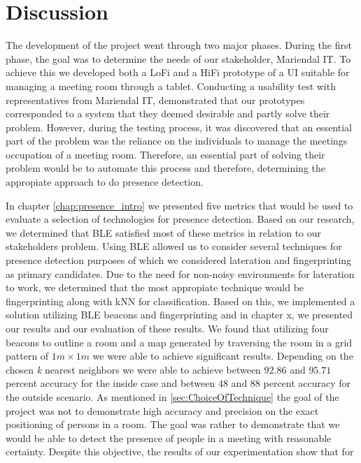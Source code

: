 \chapter{Discussion}\label{chap:discussion}
The development of the project went through two major phases. 
During the first phase, the goal was to determine the needs of our stakeholder, Mariendal IT. 
To achieve this we developed both a LoFi and a HiFi prototype of a UI suitable for managing a meeting room through a tablet.
Conducting a usability test with representatives from Mariendal IT, demonstrated that our prototypes corresponded to a system that they deemed desirable and partly solve their problem.
However, during the testing process, it was discovered that an essential part of the problem was the reliance on the individuals to manage the meetings occupation of a meeting room.
Therefore, an essential part of solving their problem would be to automate this process and therefore, determining the appropiate approach to do presence detection.

In chapter \ref{chap:presence_intro} we presented five metrics that would be used to evaluate a selection of technologies for presence detection. 
Based on our research, we determined that BLE satisfied most of these metrics in relation to our stakeholders problem.
Using BLE allowed us to consider several techniques for presence detection purposes of which we considered lateration and fingerprinting as primary candidates.
Due to the need for non-noisy environments for lateration to work, we determined that the most appropiate technique would be fingerprinting along with kNN for classification.
Based on this, we implemented a solution utilizing BLE beacons and fingerprinting and in chapter x, we presented our results and our evaluation of these results. 
We found that utilizing four beacons to outline a room and a map generated by traversing the room in a grid pattern of $1m \times 1m$ we were able to achieve significant results. 
Depending on the chosen \textit{k} nearest neighbors we were able to achieve between $92.86$ and $95.71$ percent accuracy for the inside case and between $48$ and $88$ percent accuracy for the outside scenario. 
As mentioned in \ref{sec:ChoiceOfTechnique} the goal of the project was not to demonstrate high accuracy and precision on the exact positioning of persons in a room. 
The goal was rather to demonstrate that we would be able to detect the presence of people in a meeting with reasonable certainty.
Despite this objective, the results of our experimentation show that for

